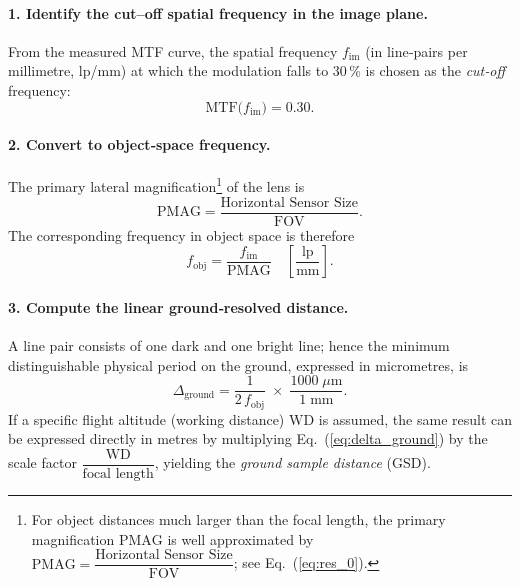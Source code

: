 \paragraph{1. Identify the cut–off spatial frequency in the image plane.}
From the measured MTF curve, the spatial frequency
$f_{\text{im}}$ (in line‑pairs per millimetre, lp/mm) at which the modulation falls to
30\,\% is chosen as the \emph{cut‑off} frequency:
%
\begin{equation}
    \text{MTF}\bigl(f_{\text{im}}\bigr)=0.30.
    \label{eq:mtf_cutoff}
\end{equation}

\paragraph{2. Convert to object‑space frequency.}
The primary lateral magnification\footnote{For object distances
much larger than the focal length, the primary magnification
$\text{PMAG}$ is well approximated by
$\text{PMAG}= \dfrac{\text{Horizontal Sensor Size}}{\text{FOV}}$;
see Eq.~(\ref{eq:res_0}).} of the lens is
%
\begin{equation}
    \text{PMAG}= \frac{\text{Horizontal Sensor Size}}{\text{FOV}}.
\end{equation}
%
The corresponding frequency in object space is therefore
%
\begin{equation}
    f_{\text{obj}} = \frac{f_{\text{im}}}{\text{PMAG}}
    \quad\left[\frac{\text{lp}}{\text{mm}}\right].
    \label{eq:f_obj}
\end{equation}

\paragraph{3. Compute the linear ground‑resolved distance.}
A line pair consists of one dark and one bright line; hence the minimum
distinguishable physical period on the ground, expressed in micrometres, is
%
\begin{equation}
    \Delta_{\text{ground}} =
    \frac{1}{2\,f_{\text{obj}}}\;\times\;
    \frac{1000\;\mu\text{m}}{1\;\text{mm}}.
    \label{eq:delta_ground}
\end{equation}
%
If a specific flight altitude (working distance) $\text{WD}$ is assumed, the
same result can be expressed directly in metres by multiplying
Eq.~(\ref{eq:delta_ground}) by the scale factor
$\dfrac{\text{WD}}{\text{focal length}}$, yielding the \emph{ground sample
distance} (GSD).

